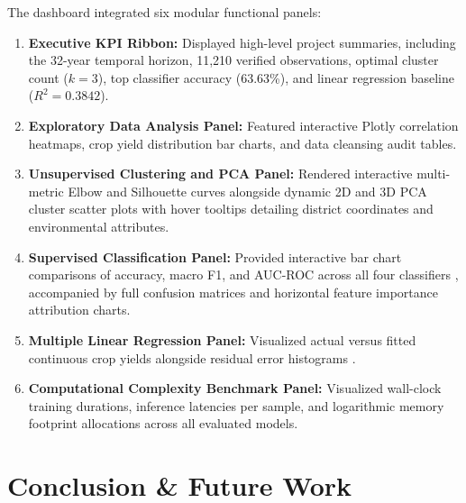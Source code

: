 \documentclass[conference]{IEEEtran}
\begin{document}
The dashboard integrated six modular functional panels:
\begin{enumerate}
    \item \textbf{Executive KPI Ribbon:} Displayed high-level project summaries, including the 32-year temporal horizon, 11,210 verified observations, optimal cluster count ($k=3$), top classifier accuracy (63.63\%), and linear regression baseline ($R^2 = 0.3842$).
    \item \textbf{Exploratory Data Analysis Panel:} Featured interactive Plotly correlation heatmaps, crop yield distribution bar charts, and data cleansing audit tables.
    \item \textbf{Unsupervised Clustering and PCA Panel:} Rendered interactive multi-metric Elbow and Silhouette curves \cite{rousseeuw1987} alongside dynamic 2D and 3D PCA cluster scatter plots \cite{hotelling1933} with hover tooltips detailing district coordinates and environmental attributes.
    \item \textbf{Supervised Classification Panel:} Provided interactive bar chart comparisons of accuracy, macro F1, and AUC-ROC across all four classifiers \cite{breiman2001, cortes1995, quinlan1986, hastie2009}, accompanied by full confusion matrices and horizontal feature importance attribution charts.
    \item \textbf{Multiple Linear Regression Panel:} Visualized actual versus fitted continuous crop yields alongside residual error histograms \cite{hoerl1970}.
    \item \textbf{Computational Complexity Benchmark Panel:} Visualized wall-clock training durations, inference latencies per sample, and logarithmic memory footprint allocations across all evaluated models.
\end{enumerate}

\section{Conclusion \& Future Work}
\end{document}
